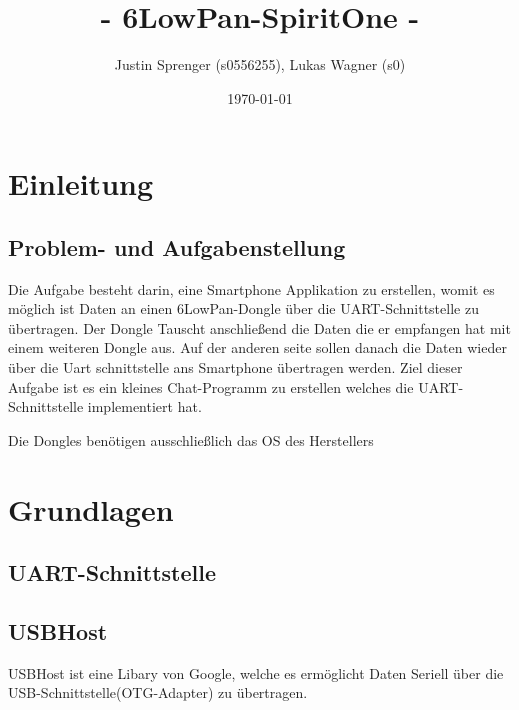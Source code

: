 \documentclass[a4paper, 12.5pt]{scrartcl}
\begin{document}
\begin{titlepage}
\author{Justin Sprenger (s0556255), 
Lukas Wagner (s0)} 
\title{- 6LowPan-SpiritOne -} 
\date{\today} 
\maketitle
\end{titlepage}

\tableofcontents
\newpage
\section{Einleitung}
\subsection{Problem- und Aufgabenstellung}

Die Aufgabe besteht darin, eine Smartphone Applikation zu erstellen, womit es möglich ist Daten an einen 6LowPan-Dongle über die UART-Schnittstelle zu übertragen. Der Dongle Tauscht anschließend die Daten die er empfangen hat mit einem weiteren Dongle aus. Auf der anderen seite sollen danach die Daten wieder über die Uart schnittstelle ans Smartphone übertragen werden. Ziel dieser Aufgabe ist es ein kleines Chat-Programm zu erstellen welches die UART-Schnittstelle implementiert hat.

Die Dongles benötigen ausschließlich das OS des Herstellers 

\section{Grundlagen}

\subsection{UART-Schnittstelle}



\subsection{USBHost} 

USBHost ist eine Libary von Google, welche es ermöglicht Daten Seriell über die USB-Schnittstelle(OTG-Adapter) zu übertragen. 

\end{document}
